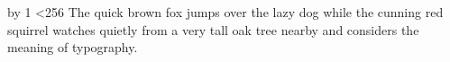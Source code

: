 \documentclass{article}
\begin{document}
\hsize=200pt\parindent=0pt
\newcount\efc {}
\def\dumpef#1{\directlua{EF[#1] = \the\efcode\font #1 }}
\loop
  \expandafter\dumpef\expandafter{\the\efc}%
  \advance\efc by 1
\ifnum\efc<256 \repeat
The quick brown fox jumps over the lazy dog while the cunning red
squirrel watches quietly from a very tall oak tree nearby and
considers the meaning of typography.\par
\end{document}

